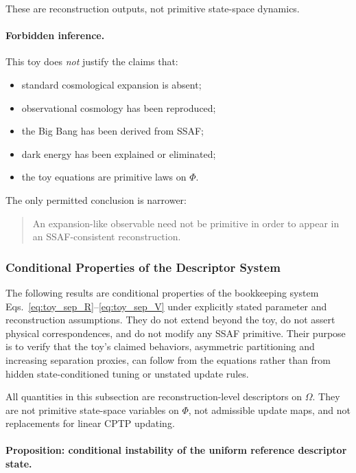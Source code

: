 \documentclass[aps,prx,onecolumn,11pt]{revtex4-2}
\theoremstyle{plain}
\theoremstyle{definition}
\theoremstyle{remark}
\begin{document}
These are reconstruction outputs, not primitive state-space dynamics.

\paragraph{Forbidden inference.}

This toy does \emph{not} justify the claims that:

\begin{itemize}
\item standard cosmological expansion is absent;
\item observational cosmology has been reproduced;
\item the Big Bang has been derived from SSAF;
\item dark energy has been explained or eliminated;
\item the toy equations are primitive laws on \(\Phi\).
\end{itemize}

The only permitted conclusion is narrower:
\begin{quote}
An expansion-like observable need not be primitive in order to appear in
an SSAF-consistent reconstruction.
\end{quote}

\subsubsection{Conditional Properties of the Descriptor System}
\label{subsec:ignition_propositions}

The following results are conditional properties of the bookkeeping
system Eqs.~\eqref{eq:toy_sep_R}--\eqref{eq:toy_sep_V} under explicitly
stated parameter and reconstruction assumptions. They do not extend
beyond the toy, do not assert physical correspondences, and do not
modify any SSAF primitive. Their purpose is to verify that the toy's
claimed behaviors, asymmetric partitioning and increasing separation
proxies, can follow from the equations rather than from hidden
state-conditioned tuning or unstated update rules.

All quantities in this subsection are reconstruction-level descriptors
on \(\Omega\). They are not primitive state-space variables on
\(\Phi\), not admissible update maps, and not replacements for linear
CPTP updating.


\paragraph{Proposition: conditional instability of the uniform reference descriptor state.}
\end{document}
